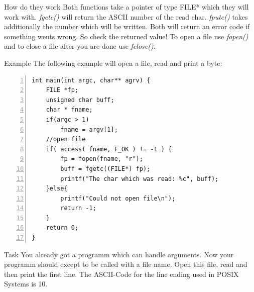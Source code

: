 \begin{frame}[fragile]{How do they work}
    Both functions take a pointer of type FILE* which they will work with. 
    \newline
    \newline
    \textit{fgetc()} will return the ASCII number of the read char.
    \newline
    \newline
    \textit{fputc()} takes additionally the number which will be written. 
    \newline
    \newline
    Both will return an error code if something wents wrong. So check the returned value!
    \newline
    \newline
    To open a file use \textit{fopen()} and to close a file after you are done use \textit{fclose()}.
\end{frame}


\begin{frame}[fragile]{Example}
    The following example will open a file, read and print a byte:
    \begin{lstlisting}[numbers=left]
int main(int argc, char** agrv) {
	FILE *fp;
	unsigned char buff;
	char * fname;
	if(argc > 1)
        fname = argv[1];
	//open file
	if( access( fname, F_OK ) != -1 ) {
        fp = fopen(fname, "r");
        buff = fgetc((FILE*) fp);
        printf("The char which was read: %c", buff);
	}else{
        printf("Could not open file\n");
        return -1;
	}
	return 0;
}   \end{lstlisting}
\end{frame}

\begin{frame}{Task}
    You already got a programm which can handle arguments.\newline
    \newline
    Now your programm should except to be called with a file name. Open this file, read and then print the first line. The ASCII-Code for the line ending used in POSIX Systems is 10.
\end{frame}



